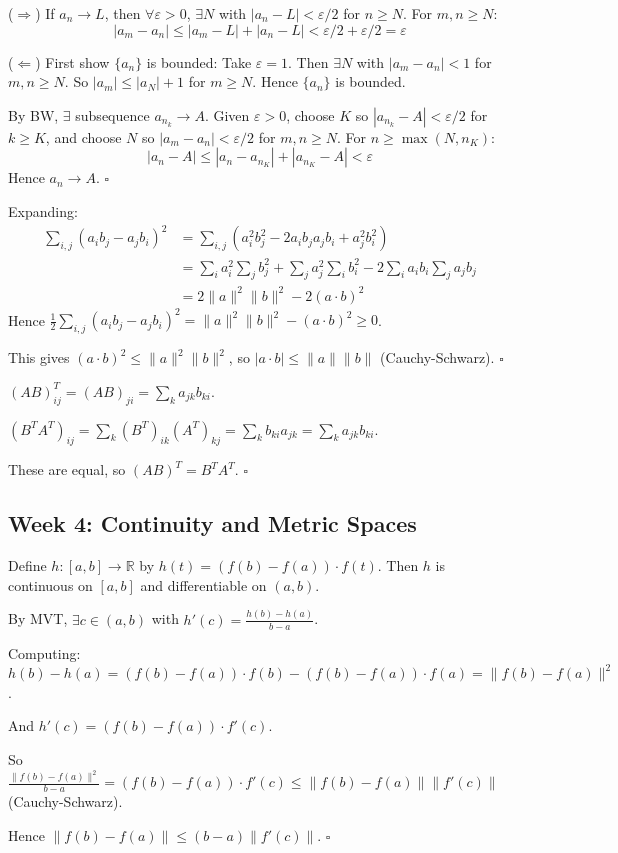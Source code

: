 \documentclass[11pt, letterpaper, openany]{book}
\newenvironment{solution}[1][Solution]{%
  \tcolorbox[blanker, breakable, left=1em,
    before skip=1em, after skip=1em,
    borderline west={2pt}{0pt}{MagicBlue},
    colback=MagicCream,
    before upper={\textcolor{MagicBlue}{\sffamily\bfseries #1.}\space}
  ]%
}{%
  \hfill\textcolor{MagicBlue}{\ensuremath{\square}}\endtcolorbox%
}
\begin{document}
\begin{solution}[3.3]
($\Rightarrow$) If $a_n \to L$, then $\forall \varepsilon > 0$, $\exists N$ with $|a_n - L| < \varepsilon/2$ for $n \geq N$. For $m, n \geq N$:
\[|a_m - a_n| \leq |a_m - L| + |a_n - L| < \varepsilon/2 + \varepsilon/2 = \varepsilon\]

($\Leftarrow$) First show $\{a_n\}$ is bounded: Take $\varepsilon = 1$. Then $\exists N$ with $|a_m - a_n| < 1$ for $m, n \geq N$. So $|a_m| \leq |a_N| + 1$ for $m \geq N$. Hence $\{a_n\}$ is bounded.

By BW, $\exists$ subsequence $a_{n_k} \to A$. Given $\varepsilon > 0$, choose $K$ so $|a_{n_k} - A| < \varepsilon/2$ for $k \geq K$, and choose $N$ so $|a_m - a_n| < \varepsilon/2$ for $m, n \geq N$. For $n \geq \max(N, n_K)$:
\[|a_n - A| \leq |a_n - a_{n_K}| + |a_{n_K} - A| < \varepsilon\]
Hence $a_n \to A$.
\end{solution}

\begin{solution}[3.5]
Expanding:
\begin{align*}
\sum_{i,j}(a_i b_j - a_j b_i)^2 &= \sum_{i,j}(a_i^2 b_j^2 - 2a_i b_j a_j b_i + a_j^2 b_i^2) \\
&= \sum_i a_i^2 \sum_j b_j^2 + \sum_j a_j^2 \sum_i b_i^2 - 2\sum_i a_i b_i \sum_j a_j b_j \\
&= 2\|a\|^2\|b\|^2 - 2(a \cdot b)^2
\end{align*}
Hence $\frac{1}{2}\sum_{i,j}(a_i b_j - a_j b_i)^2 = \|a\|^2\|b\|^2 - (a \cdot b)^2 \geq 0$.

This gives $(a \cdot b)^2 \leq \|a\|^2\|b\|^2$, so $|a \cdot b| \leq \|a\|\|b\|$ (Cauchy-Schwarz).
\end{solution}

\begin{solution}[3.7]
$(AB)^T_{ij} = (AB)_{ji} = \sum_k a_{jk} b_{ki}$.

$(B^T A^T)_{ij} = \sum_k (B^T)_{ik}(A^T)_{kj} = \sum_k b_{ki} a_{jk} = \sum_k a_{jk} b_{ki}$.

These are equal, so $(AB)^T = B^T A^T$.
\end{solution}

\subsection*{Week 4: Continuity and Metric Spaces}

\begin{solution}[4.1]
Define $h: [a,b] \to \mathbb{R}$ by $h(t) = (f(b) - f(a)) \cdot f(t)$. Then $h$ is continuous on $[a,b]$ and differentiable on $(a,b)$.

By MVT, $\exists c \in (a,b)$ with $h'(c) = \frac{h(b) - h(a)}{b-a}$.

Computing: $h(b) - h(a) = (f(b) - f(a)) \cdot f(b) - (f(b) - f(a)) \cdot f(a) = \|f(b) - f(a)\|^2$.

And $h'(c) = (f(b) - f(a)) \cdot f'(c)$.

So $\frac{\|f(b) - f(a)\|^2}{b-a} = (f(b) - f(a)) \cdot f'(c) \leq \|f(b) - f(a)\| \|f'(c)\|$ (Cauchy-Schwarz).

Hence $\|f(b) - f(a)\| \leq (b-a)\|f'(c)\|$.
\end{solution}
\end{document}
